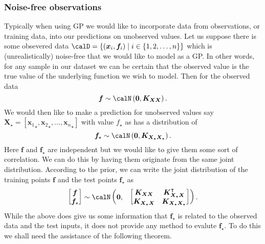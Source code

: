 \subsubsection{Noise-free observations}\label{Section1.5.1}
Typically when using GP we would like to incorporate data from observations, or training data, into our predictions on unobserved values.
Let us suppose there is some obsevered data $\calD = \left\{ (\bm{x}_i, \bm{f}_i) \mid i \in \left\{ 1,2, \ldots , n \right\} \right\}$ which is (unrealistically) noise-free that we would like to model as a GP. In other words, for any sample in our dataset we can be certain that the observed value is the true value of the underlying function we wish to model. Then for the observed data
\[
    \bm{f} \sim \calN \left( \bm{0}, \bm{K_{XX}} \right).
\]
We would then like to make a prediction for unobserved values say $\bm{X}_{\star} = \left[ {\bm{x}_1}_{\star}, {\bm{x}_2}_{\star}, \ldots , {\bm{x}_{n}}_{\star} \right]$ with value $f_{\star}$ as has a distribution of
\[
    \bm{f}_{\star} \sim \calN \left( \bm{0}, \bm{K_{X_{\star}X_{\star}}} \right).
\]
Here $\bm{f}$ and $\bm{f}_{\star}$ are independent but we would like to give them some sort of correlation. We can do this by having them originate from the same joint distribution. According to the prior, we can write the joint distribution of the training points $\bm{f}$ and the test points $\bm{f}_{\star}$ as
\[
    \begin{bmatrix}
        \bm{f} \\
        \bm{f}_{\star}
    \end{bmatrix}
    \sim \calN
    \begin{pmatrix}
        \bm{0}, &
        {
                \begin{bmatrix}
                    \bm{K_{XX}}         & \bm{K_{X_{\star}X}}^{\intercal} \\
                    \bm{K_{X_{\star}X}} & \bm{K_{X_{\star}X_{\star}}}
                \end{bmatrix}
            }
    \end{pmatrix}.
\]
While the above does give us some information that $\bm{f}_{\star}$ is related to the observed data and the test inputs, it does not provide any method to evalute $\bm{f}_{\star}$. To do this we shall need the assistance of the following theorem.
